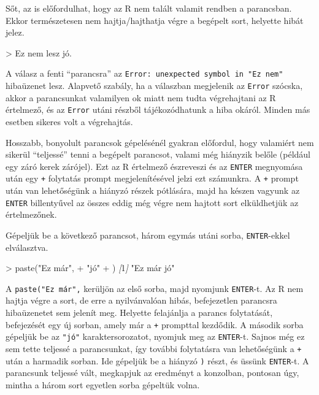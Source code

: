 \documentclass[
]{book}
\newenvironment{Shaded}{\begin{snugshade}}{\end{snugshade}}
\newcommand{\AttributeTok}[1]{\textcolor[rgb]{0.77,0.63,0.00}{#1}}
\newcommand{\CommentTok}[1]{\textcolor[rgb]{0.56,0.35,0.01}{\textit{#1}}}
\newcommand{\NormalTok}[1]{#1}
\newcommand{\OtherTok}[1]{\textcolor[rgb]{0.56,0.35,0.01}{#1}}
\newcommand{\SpecialStringTok}[1]{\textcolor[rgb]{0.31,0.60,0.02}{#1}}
\begin{document}
Sőt, az is előfordulhat, hogy az R nem talált valamit rendben a parancsban. Ekkor természetesen nem hajtja/hajthatja végre a begépelt sort, helyette hibát jelez.

\begin{Shaded}
\begin{Highlighting}[]
\AttributeTok{\textgreater{} Ez nem lesz jó.}
\end{Highlighting}
\end{Shaded}

A válasz a fenti ``parancsra'' az \texttt{Error:\ unexpected\ symbol\ in\ "Ez\ nem"} hibaüzenet lesz. Alapvető szabály, ha a válaszban megjelenik az \texttt{Error} szócska, akkor a parancsunkat valamilyen ok miatt nem tudta végrehajtani az R értelmező, és az \texttt{Error} utáni részből tájékozódhatunk a hiba okáról. Minden más esetben sikeres volt a végrehajtás.

Hosszabb, bonyolult parancsok gépelésénél gyakran előfordul, hogy valamiért nem sikerül ``teljessé'' tenni a begépelt parancsot, valami még hiányzik belőle (például egy záró kerek zárójel). Ezt az R értelmező észreveszi és az \texttt{ENTER} megnyomása után egy \texttt{+} folytatás prompt megjelenítésével jelzi ezt számunkra. A \texttt{+} prompt után van lehetőségünk a hiányzó részek pótlására, majd ha készen vagyunk az \texttt{ENTER} billentyűvel az összes eddig még végre nem hajtott sort elküldhetjük az értelmezőnek.

Gépeljük be a következő parancsot, három egymás utáni sorba, \texttt{ENTER}-ekkel elválasztva.

\begin{Shaded}
\begin{Highlighting}[]
\AttributeTok{\textgreater{} paste("Ez már",}
\SpecialStringTok{+        }\NormalTok{"jó"}
\SpecialStringTok{+       }\NormalTok{)}
\CommentTok{[}\OtherTok{1}\CommentTok{]}\NormalTok{ "Ez már jó"}
\end{Highlighting}
\end{Shaded}

A \texttt{paste("Ez\ már",} kerüljön az első sorba, majd nyomjunk \texttt{ENTER}-t. Az R nem hajtja végre a sort, de erre a nyilvánvalóan hibás, befejezetlen parancsra hibaüzenetet sem jelenít meg. Helyette felajánlja a parancs folytatását, befejezését egy új sorban, amely már a \texttt{+} prompttal kezdődik. A második sorba gépeljük be az \texttt{"jó"} karaktersorozatot, nyomjuk meg az \texttt{ENTER}-t. Sajnos még ez sem tette teljessé a parancsunkat, így további folytatásra van lehetőségünk a \texttt{+} után a harmadik sorban. Ide gépeljük be a hiányzó \texttt{)} részt, és üssünk \texttt{ENTER}-t. A parancsunk teljessé vált, megkapjuk az eredményt a konzolban, pontosan úgy, mintha a három sort egyetlen sorba gépeltük volna.
\end{document}

